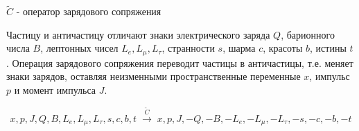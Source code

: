 \documentclass[a4paper]{article}
\begin{document}
$\tilde{C}$ - оператор зарядового сопряжения

Частицу и античастицу отличают знаки электрического заряда $Q$, барионного числа $B$, лептонных чисел $L_e, L_{\mu}, L_{\tau}$, 
странности $s$, шарма $c$, красоты $b$, истины $t$. Операция зарядового сопряжения  переводит частицы в античастицы, 
т.е. меняет знаки зарядов, оставляя неизменными пространственные переменные $x$, импульс $p$ и момент импульса $J$.

$$x, p, J, Q, B, L_e, L_{\mu}, L_{\tau}, s, c, b, t \; \stackrel{\tilde{C}}{\rightarrow} \; x, p, J, -Q, -B, -L_e, -L_{\mu}, -L_{\tau}, -s, -c, -b, -t$$
\end{document}
